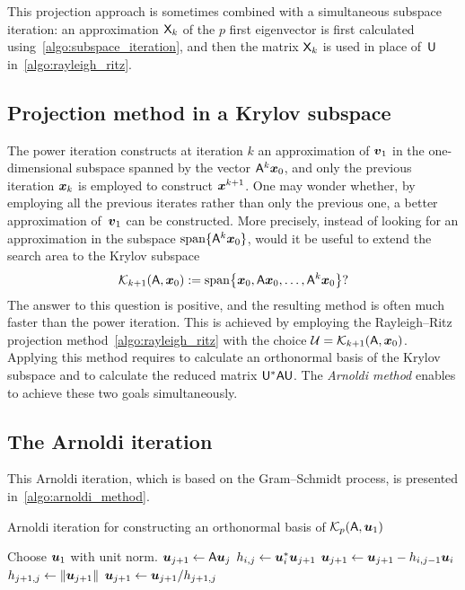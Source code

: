 This projection approach is sometimes combined with a simultaneous subspace iteration:
an approximation $\mathsf X_k$ of the $p$ first eigenvector is first calculated using~\cref{algo:subspace_iteration},
and then the matrix $\mathsf X_k$ is used in place of~$\mathsf U$ in~\cref{algo:rayleigh_ritz}.

\subsection{Projection method in a Krylov subspace}
The power iteration constructs at iteration $k$ an approximation of $\mathbf{\boldsymbol{v}}_1$ in the one-dimensional subspace spanned by the vector $\mathsf A^k \mathbf{\boldsymbol{x}}_0$,
and only the previous iteration $\mathbf{\boldsymbol{x}}_{k}$ is employed to construct $\mathbf{\boldsymbol{x}}^{k+1}$.
One may wonder whether,
by employing all the previous iterates rather than only the previous one,
a better approximation of~$\mathbf{\boldsymbol{v}}_1$ can be constructed.
More precisely, instead of looking for an approximation in the subspace $\operatorname{span} \{\mathsf A^k \mathbf{\boldsymbol{x}}_0\}$,
would it be useful to extend the search area to the Krylov subspace
\[
    \mathcal K_{k+1}(\mathsf A, \mathbf{\boldsymbol{x}}_0) := \operatorname{span} \bigl\{ \mathbf{\boldsymbol{x}}_0, \mathsf A \mathbf{\boldsymbol{x}}_0, \dotsc, \mathsf A^k \mathbf{\boldsymbol{x}}_0 \bigr\}?
\]
The answer to this question is positive,
and the resulting method is often much faster than the power iteration.
This is achieved by employing the Rayleigh--Ritz projection method~\cref{algo:rayleigh_ritz} with the choice $\mathcal U = \mathcal K_{k+1}(\mathsf A, \mathbf{\boldsymbol{x}}_0)$.
Applying this method requires to calculate an orthonormal basis of the Krylov subspace and to calculate the reduced matrix $\mathsf U^* \mathsf A \mathsf U$.
The \emph{Arnoldi method} enables to achieve these two goals simultaneously.

\subsection{The Arnoldi iteration}
This Arnoldi iteration, which is based on the Gram--Schmidt process,
is presented in~\cref{algo:arnoldi_method}.
\begin{algorithm}
\caption{Arnoldi iteration for constructing an orthonormal basis of $\mathcal K_p(\mathsf A, \mathbf{\boldsymbol{u}}_1)$}%
\label{algo:arnoldi_method}%
\begin{algorithmic}
\State Choose $\mathbf{\boldsymbol{u}}_1$ with unit norm.
    \State $\mathbf{\boldsymbol{u}}_{j+1} \gets \mathsf A \mathbf{\boldsymbol{u}}_{j}$
        \State $h_{i,j} \gets \mathbf{\boldsymbol{u}}_{i}^* \mathbf{\boldsymbol{u}}_{j+1}$
        \State $\mathbf{\boldsymbol{u}}_{j+1} \gets \mathbf{\boldsymbol{u}}_{j+1} - h_{i,j-1} \mathbf{\boldsymbol{u}}_{i}$
    \EndFor
    \State $h_{j+1,j} \gets \lVert\mathbf{\boldsymbol{u}}_{j+1}\rVert$
    \State $\mathbf{\boldsymbol{u}}_{j+1} \gets \mathbf{\boldsymbol{u}}_{j+1} / h_{j+1,j}$
\EndFor
\end{algorithmic}
\end{algorithm}

